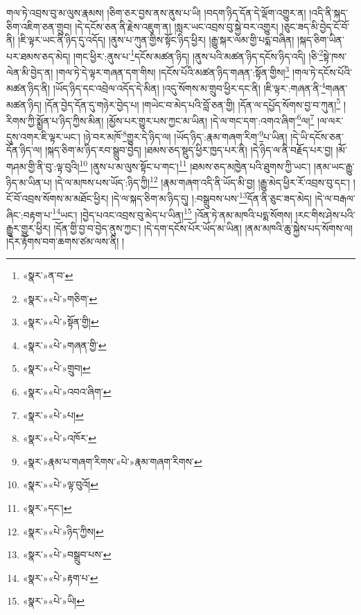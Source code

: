 གལ་ཏེ་འབྲས་བུ་མ་ལུས་རྣམས། །ཅིག་ཅར་བྱས་ནས་ནུས་པ་ཡི། །བདག་ཉིད་དོན་དེ་ལྡོག་འགྱུར་ན། །འདི་ནི་སྐད་ཅིག་འཇིག་ཅན་གྲུབ། །དེ་དངོས་ཅན་ནི་རྗེས་འཇུག་ན། །སླར་ཡང་འབྲས་བུ་སྐྱེ་བར་འགྱུར། །ཅུང་ཟད་མི་བྱེད་ངོ་བོ་ནི། །ཇི་ལྟར་ཡང་ནི་ཉིད་དུ་འདོད། །ནུས་པ་ཀུན་གྱིས་སྟོང་ཉིད་ཕྱིར། །རྒྱུ་སྐར་ལམ་གྱི་པདྨ་བཞིན། །སྐད་ཅིག་ཡིན་པར་ཐམས་ཅད་མེད། །གང་ཕྱིར་:ནུས་པ་\footnote{«སྣར་»ན་བ་}དངོས་མཚན་ཉིད། །ནུས་པའི་མཚན་ཉིད་དངོས་ཉིད་འདི། །ཅི་\footnote{«སྣར་»«པེ་»གཅིག་}སྟེ་ཁས་ལེན་མི་བྱེད་ན། །གལ་ཏེ་དེ་ལྟར་གཞན་དག་གིས། །དངོས་པོའི་མཚན་ཉིད་གཞན་:སྟོན་གྱིས།\footnote{«སྣར་»«པེ་»སྟོན་གྱི།} །གལ་ཏེ་དངོས་པོའི་མཚན་ཉིད་ནི། །ཡོད་ཉིད་དང་འབྲེལ་འདོད་དེ་མིན། །འདུ་སོགས་མ་གྲུབ་ཕྱིར་དང་ནི། །ཇི་ལྟར་:གཞན་ནི་\footnote{«སྣར་»«པེ་»གཞན་གྱི་}གཞན་མཚན་ཉིད། །དོན་བྱེད་དོན་དུ་གཉེར་བྱེད་པ། །གཡེང་བ་མེད་པའི་བློ་ཅན་གྱི། །དོན་ལ་དཔྱོད་སོགས་བྱ་བ་ཀུན།\footnote{«སྣར་»«པེ་»གྲུབ།} །རིགས་ཀྱི་སྨྱོན་པ་ཉིད་ཀྱིས་མིན། །མྱོས་པར་གྱུར་པས་ཀྱང་མ་ཡིན། །དེ་ལ་གང་དག་:འགའ་ཞིག་\footnote{«སྣར་»«པེ་»འབའ་ཞིག་}ལ།\footnote{«སྣར་»«པེ་»པ།} །ལ་ལར་དུས་འགར་ཇི་ལྟར་ཡང་། །ཉེ་བར་མཁོ་\footnote{«སྣར་»«པེ་»འཁོར་}གྱུར་དེ་ཉིད་ལ། །ཡོད་ཉིད་:རྣམ་གཞག་རིག་\footnote{«སྣར་»རྣམ་པ་གཞག་རིགས་«པེ་»རྣམ་གཞག་རིགས་}པ་ཡིན། །དེ་ཡི་དངོས་ཅན་དོན་ཉིད་ལ། །སྐད་ཅིག་མ་ཉིད་རབ་སྒྲུབ་བྱེད། །ཐམས་ཅད་སྡུད་ཕྱིར་ཁྱད་པར་ནི། །དེ་ཉིད་ལ་ནི་བརྗོད་པར་བྱ། །མོ་གཤམ་གྱི་ནི་བུ་:ལྟ་བུའི།\footnote{«སྣར་»«པེ་»ལྟ་བུའོ།} །ནུས་པ་མ་ལུས་སྟོང་པ་གང་།\footnote{«སྣར་»དང་།} །ཐམས་ཅད་མཁྱེན་པའི་ཐུགས་ཀྱི་ཡང་། །ནམ་ཡང་རྒྱུ་ཉིད་མ་ཡིན་པ། །དེ་ལ་མཁས་པས་ཡོད་:ཉིད་ཀྱི།\footnote{«སྣར་»«པེ་»ཉིད་ཀྱིས།} །རྣམ་གཞག་འདི་ནི་ཡོད་མི་བྱ། །རྒྱུ་མེད་ཕྱིར་རོ་འབྲས་བུ་དང་། །ངོ་བོ་འབྲས་སོགས་མ་མཐོང་ཕྱིར། །དེ་ལ་སྐད་ཅིག་མ་ཉིད་དུ། །:བསྒྲུབས་པས་\footnote{«སྣར་»«པེ་»བསྒྲུབ་པས་}དོན་ནི་ཅུང་ཟད་མེད། །དེ་ལ་བརྒལ་ཞིང་:བརྟག་པ་\footnote{«སྣར་»«པེ་»རྟག་པ་}ཡང་། །བྱེད་པའང་འབྲས་བུ་མེད་པ་ཡིན།\footnote{«སྣར་»«པེ་»ཡི།} །འོན་ཏེ་ནམ་མཁའི་པདྨ་སོགས། །རང་གིས་ཤེས་པའི་རྒྱུར་གྱུར་ཕྱིར། །དོན་གྱི་བྱ་བ་བྱེད་ནུས་ཀྱང་། །དེ་དག་དངོས་པོར་ཡོད་མ་ཡིན། །ནམ་མཁའི་ཆུ་སྐྱེས་པད་སོགས་ལ། །དེར་རྟོགས་བག་ཆགས་ཙམ་ལས་ནི། །
